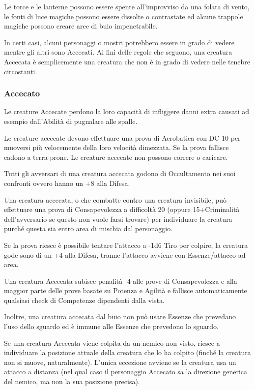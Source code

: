 \documentclass[a4paper,11pt,twoside,openany]{book}
\begin{document}
{\label{buio}

Le torce e le lanterne possono essere spente all'improvviso da una folata di vento, le fonti di luce magiche possono essere dissolte o contrastate ed alcune trappole magiche possono creare aree di buio impenetrabile.

In certi casi, alcuni personaggi o mostri potrebbero essere in grado di vedere mentre gli altri sono Accecati. Ai fini delle regole che seguono, una creatura Accecata è semplicemente una creatura che non è in grado di vedere nelle tenebre circostanti.

\subsubsection{Accecato}

\label{accecato}

Le creature Accecate perdono la loro capacità di infliggere danni extra causati ad esempio dall'Abilità di pugnalare alle spalle.

Le creature accecate devono effettuare una prova di Acrobatica con DC 10 per muoversi più velocemente della loro velocità dimezzata. Se la prova fallisce cadono a terra prone. Le creature accecate non possono correre o caricare.

Tutti gli avversari di una creatura accecata godono di Occultamento nei suoi confronti ovvero hanno un +8 alla Difesa.

Una creatura accecata, o che combatte contro una creatura invisibile, può effettuare una prova di Consapevolezza a difficoltà 20 (oppure 15+Criminalità dell'avversario se questo non vuole farsi trovare) per individuare la creatura purché questa sia entro area di mischia dal personaggio.

Se la prova riesce è possibile tentare l'attacco a -1d6 Tiro per colpire, la creatura gode sono di un +4 alla Difesa, tranne l'attacco avviene con Essenze/attacco ad area.

Una creatura Accecata subisce penalità -4 alle prove di Consapevolezza e alla maggior parte delle prove basate su Potenza e Agilità e fallisce automaticamente qualsiasi check di Competenze dipendenti dalla vista. 

Inoltre, una creatura accecata dal buio non può usare Essenze che prevedano l'uso dello sguardo ed è immune alle Essenze che prevedono lo sguardo.

Se una creatura Accecata viene colpita da un nemico non visto, riesce a individuare la posizione attuale della creatura che lo ha colpito (finché la creatura non si muove, naturalmente). L'unica eccezione avviene se la creatura usa un attacco a distanza (nel qual caso il personaggio Accecato sa la direzione generica del nemico, ma non la sua posizione precisa).

}
\end{document}
